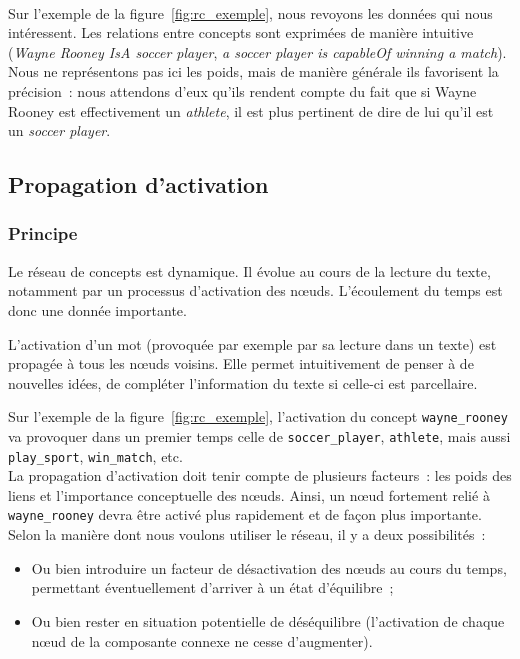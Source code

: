 \documentclass[a4paper, 12pt]{article}
\begin{document}
\paragraph{}
Sur l'exemple de la figure~\ref{fig:rc_exemple}, nous revoyons les données qui nous intéressent. Les relations entre concepts sont exprimées de manière intuitive (\textit{Wayne Rooney IsA soccer player}, \textit{a soccer player is capableOf winning a match}). Nous ne représentons pas ici les poids, mais de manière générale ils favorisent la précision~: nous attendons d'eux qu'ils rendent compte du fait que si Wayne Rooney est effectivement un \textit{athlete}, il est plus pertinent de dire de lui qu'il est un \textit{soccer player}.


\subsection{Propagation d'activation}

\subsubsection{Principe}

Le réseau de concepts est dynamique. Il évolue au cours de la lecture du texte, notamment par un processus d'activation des n\oe{}uds. L'écoulement du temps est donc une donnée importante.

L'activation d'un mot (provoquée par exemple par sa lecture dans un texte) est propagée à tous les n\oe{}uds voisins. Elle permet intuitivement de penser à de nouvelles idées, de compléter l'information du texte si celle-ci est parcellaire.

Sur l'exemple de la figure~\ref{fig:rc_exemple}, l'activation du concept \verb|wayne_rooney| va provoquer dans un premier temps celle de \verb|soccer_player|, \verb|athlete|, mais aussi \verb|play_sport|, \verb|win_match|, etc.\\

La propagation d'activation doit tenir compte de plusieurs facteurs~: les poids des liens et l'importance conceptuelle des n\oe{}uds. Ainsi, un n\oe{}ud fortement relié à \verb|wayne_rooney| devra être activé plus rapidement et de façon plus importante.\\

Selon la manière dont nous voulons utiliser le réseau, il y a deux possibilités~:
\begin{itemize}
  \item Ou bien introduire un facteur de désactivation des n\oe{}uds au cours du temps, permettant éventuellement d'arriver à un état d'équilibre~;
 \item Ou bien rester en situation potentielle de déséquilibre (l'activation de chaque n\oe{}ud de la composante connexe ne cesse d'augmenter).
\end{itemize}
\end{document}
